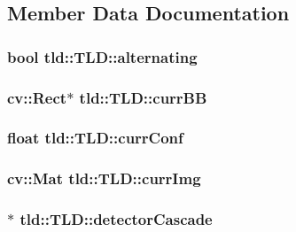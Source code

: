 \subsection{Member Data Documentation}
\hypertarget{classtld_1_1_t_l_d_a873bb61492173098b134d94239ef0ba4}{
\subsubsection[{alternating}]{\setlength{\rightskip}{0pt plus 5cm}bool {\bf tld::TLD::alternating}}}
\label{classtld_1_1_t_l_d_a873bb61492173098b134d94239ef0ba4}
\hypertarget{classtld_1_1_t_l_d_a5af4bc9d8fa64c4423b294f727c4ba55}{
\subsubsection[{currBB}]{\setlength{\rightskip}{0pt plus 5cm}cv::Rect$\ast$ {\bf tld::TLD::currBB}}}
\label{classtld_1_1_t_l_d_a5af4bc9d8fa64c4423b294f727c4ba55}
\hypertarget{classtld_1_1_t_l_d_ab2e815db72cb2f40a7864c4d4457eb34}{
\subsubsection[{currConf}]{\setlength{\rightskip}{0pt plus 5cm}float {\bf tld::TLD::currConf}}}
\label{classtld_1_1_t_l_d_ab2e815db72cb2f40a7864c4d4457eb34}
\hypertarget{classtld_1_1_t_l_d_a7bb2c3271567719afb2f97e5953c31d5}{
\subsubsection[{currImg}]{\setlength{\rightskip}{0pt plus 5cm}cv::Mat {\bf tld::TLD::currImg}}}
\label{classtld_1_1_t_l_d_a7bb2c3271567719afb2f97e5953c31d5}
\hypertarget{classtld_1_1_t_l_d_abe59bf99d46b55f6ef402cb48f9d290b}{
\subsubsection[{detectorCascade}]{$\ast$ {\bf tld::TLD::detectorCascade}}}
